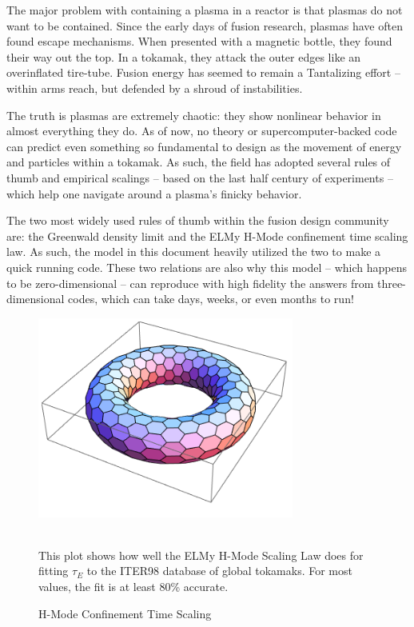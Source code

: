 The major problem with containing a plasma in a reactor is that plasmas do not want to be contained. Since the early days of fusion research, plasmas have often found escape mechanisms. When presented with a magnetic bottle, they found their way out the top. In a tokamak, they attack the outer edges like an overinflated tire-tube. Fusion energy has seemed to remain a Tantalizing effort -- within arms reach, but defended by a shroud of instabilities.

The truth is plasmas are extremely chaotic: they show nonlinear behavior in almost everything they do. As of now, no theory or supercomputer-backed code can predict even something so fundamental to design as the movement of energy and particles within a tokamak. As such, the field has adopted several rules of thumb and empirical scalings -- based on the last half century of experiments -- which help one navigate around a plasma's finicky behavior.

The two most widely used rules of thumb within the fusion design community are: the Greenwald density limit and the ELMy H-Mode confinement time scaling law. As such, the model in this document heavily utilized the two to make a quick running code. These two relations are also why this model -- which happens to be zero-dimensional -- can reproduce with high fidelity the answers from three-dimensional codes, which can take days, weeks, or even months to run!

\begin{figure}
	\centering
%		
	\includegraphics[width=0.75\textwidth]{images/test_image}
	\caption{H-Mode Confinement Time Scaling} ~\\
	\small This plot shows how well the ELMy H-Mode Scaling Law does for fitting $\tau_E$ to the ITER98 database of global tokamaks. For most values, the fit is at least 80\% accurate.
\end{figure}

